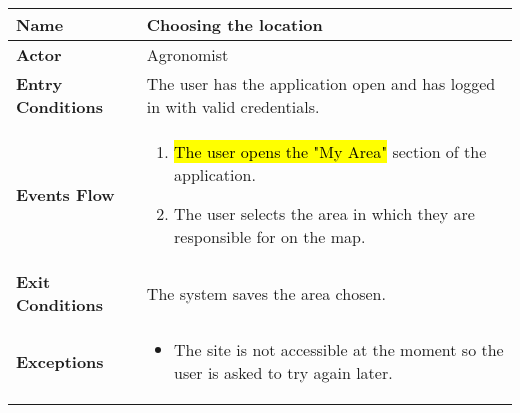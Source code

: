 
\begin{table}[hbt!]
\centering
\renewcommand{\arraystretch}{1.25}
\begin{tabular}{|l|>{\raggedright\arraybackslash}m{12cm}|}

    \hline
    \textbf{Name} & Choosing the location\\
    \hline
   	\textbf{Actor} & Agronomist\\
    \hline
    \textbf{Entry Conditions} & The user has the application open and has logged in with valid credentials.\\
    \hline
    \textbf{Events Flow} & \begin{enumerate}
            \item \hl{The user opens the "My Area"} section of the application.
            \item The user selects the area in which they are responsible for on the map.
       \end{enumerate}\\
    \hline
    \textbf{Exit Conditions} & The system saves the area chosen.\\
    \hline
    \textbf{Exceptions} & 
        \begin{itemize}
          \item The site is not accessible at the moment so the user is asked to try again later.
        \end{itemize}
     \\
    \hline
\end{tabular}
\end{table}